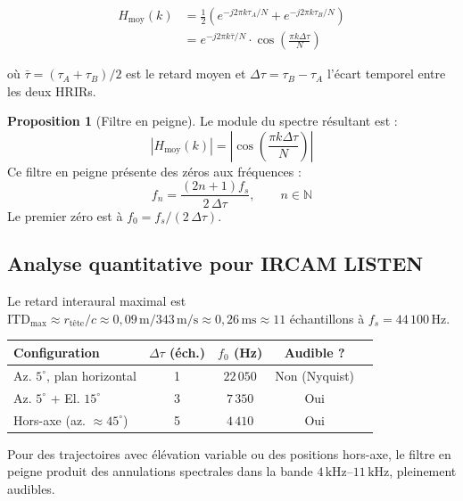 \documentclass[12pt, a4paper]{article}
\theoremstyle{definition}
\newtheorem{proposition}{Proposition}[section]
\newcommand{\N}{\mathbb{N}}
\newcommand{\abs}[1]{\left| #1 \right|}
\newcommand{\ITD}{\mathrm{ITD}}
\begin{document}
\begin{align}
  H_{\text{moy}}(k)
    &= \frac{1}{2}\left(e^{-j2\pi k\tau_A/N} + e^{-j2\pi k\tau_B/N}\right) \\
    &= e^{-j2\pi k\bar{\tau}/N} \cdot \cos\!\left(\frac{\pi k \Delta\tau}{N}\right)
    \label{eq:comb}
\end{align}

où $\bar{\tau} = (\tau_A + \tau_B)/2$ est le retard moyen et
$\Delta\tau = \tau_B - \tau_A$ l'écart temporel entre les deux HRIRs.

\begin{proposition}[Filtre en peigne]
  Le module du spectre résultant est :
  \begin{equation}
    \abs{H_{\text{moy}}(k)} = \abs{\cos\!\left(\frac{\pi k \Delta\tau}{N}\right)}
  \end{equation}
  Ce filtre en peigne présente des zéros aux fréquences :
  \begin{equation}
    f_n = \frac{(2n+1) f_s}{2\,\Delta\tau}, \qquad n \in \N
  \end{equation}
  Le premier zéro est à $f_0 = f_s / (2\,\Delta\tau)$.
\end{proposition}

\subsection{Analyse quantitative pour IRCAM LISTEN}

Le retard interaural maximal est $\ITD_{\max} \approx r_{\text{tête}} / c
\approx 0{,}09\,\text{m} / 343\,\text{m/s} \approx 0{,}26\,\text{ms}
\approx 11$ échantillons à $f_s = 44\,100\,\text{Hz}$.

\vspace{0.5em}
\begin{center}
\begin{tabular}{lcccc}
  \toprule
  Configuration & $\Delta\tau$ (éch.) & $f_0$ (Hz) & Audible ? \\
  \midrule
  Az. $5^\circ$, plan horizontal   & 1 & $22\,050$ & Non (Nyquist) \\
  Az. $5^\circ$ + El. $15^\circ$   & 3 & $7\,350$  & Oui \\
  Hors-axe (az. $\approx 45^\circ$) & 5 & $4\,410$  & Oui \\
  \bottomrule
\end{tabular}
\end{center}
\vspace{0.5em}

Pour des trajectoires avec élévation variable ou des positions hors-axe,
le filtre en peigne produit des annulations spectrales dans la bande
$4\,\text{kHz}$--$11\,\text{kHz}$, pleinement audibles.
\end{document}
